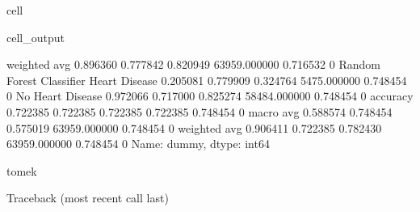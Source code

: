 \documentclass[letterpaper,10pt,english]{jupyterBook}
\begin{document}
\begin{sphinxuseclass}{cell}
\begin{sphinxVerbatimOutput}
\begin{sphinxuseclass}{cell_output}
\begin{sphinxVerbatim}[commandchars=\\\{\}]
                           weighted avg      0.896360   0.777842  0.820949  63959.000000  0.716532    0
Random Forest Classifier   Heart Disease     0.205081   0.779909  0.324764  5475.000000   0.748454    0
                           No Heart Disease  0.972066   0.717000  0.825274  58484.000000  0.748454    0
                           accuracy          0.722385   0.722385  0.722385  0.722385      0.748454    0
                           macro avg         0.588574   0.748454  0.575019  63959.000000  0.748454    0
                           weighted avg      0.906411   0.722385  0.782430  63959.000000  0.748454    0
Name: dummy, dtype: int64

tomek
\PYGZhy{}\PYGZhy{}\PYGZhy{}\PYGZhy{}\PYGZhy{}\PYGZhy{}\PYGZhy{}\PYGZhy{}\PYGZhy{}\PYGZhy{}\PYGZhy{}\PYGZhy{}\PYGZhy{}\PYGZhy{}\PYGZhy{}\PYGZhy{}\PYGZhy{}\PYGZhy{}\PYGZhy{}
\end{sphinxVerbatim}

\begin{sphinxVerbatim}[commandchars=\\\{\}]
Traceback (most recent call last)
  
     
        \PYG{p}{[}\PYG{p}{]} 
     


\end{sphinxVerbatim}
\end{sphinxuseclass}
\end{sphinxVerbatimOutput}
\end{sphinxuseclass}
\end{document}
